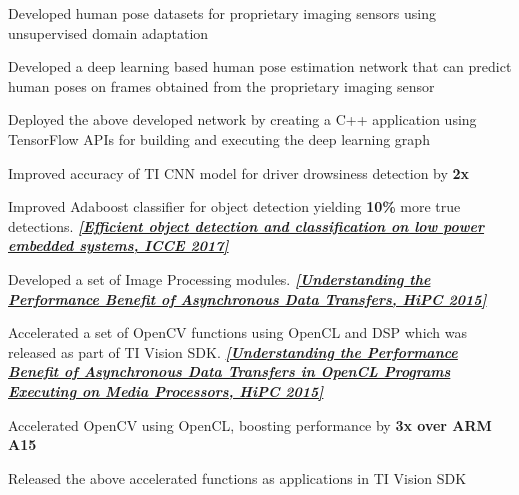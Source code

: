 \documentclass[]{deedy-resume-openfont}
\begin{document}
\begin{minipage}[t]{0.62\textwidth}

\vspace{\topsep} %
\begin{tightemize}
\item Developed human pose datasets for proprietary imaging
sensors using unsupervised domain adaptation
\item Developed a deep learning based human pose estimation network that can predict human poses on frames obtained from the
proprietary imaging sensor
\item Deployed the above developed network by creating a C++ application using TensorFlow APIs for building and
executing the deep learning graph
\end{tightemize}
\sectionsep

\vspace{\topsep} %
\begin{tightemize}
\item Improved accuracy of TI CNN model for driver drowsiness detection by {\bf 2x}
\item Improved Adaboost classifier for object detection yielding {\bf 10\%} more true detections. \href{http://ieeexplore.ieee.org/document/7889296/}{\bf \textit{[Efficient object detection and classification on low power embedded systems, ICCE 2017]}}
 \item Developed a set of Image Processing modules. \href{http://ieeexplore.ieee.org/document/7397627/}{ \bf \textit{[Understanding the Performance Benefit of Asynchronous Data Transfers, HiPC 2015]}}
 \item Accelerated a set of OpenCV functions using OpenCL and DSP which was released as part of TI Vision SDK. \href{http://ieeexplore.ieee.org/document/7397627/}{ \bf \textit{[Understanding the Performance Benefit of Asynchronous Data Transfers in OpenCL Programs Executing on Media Processors, HiPC 2015]}}
 \item Accelerated OpenCV using OpenCL, boosting performance by {\bf 3x over ARM A15}
 \item Released the above accelerated functions as applications in TI Vision SDK
\end{tightemize}
\sectionsep


\end{minipage}
\end{document}
